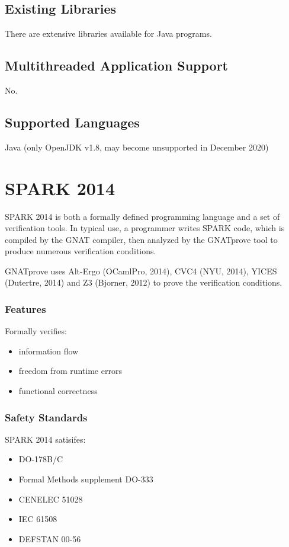 \documentclass[12pt,openany,a4paper]{book}
\begin{document}
	\subsection{Existing Libraries} 
		There are extensive libraries available for Java programs.
	\subsection{Multithreaded Application Support}
	No.
	\subsection{Supported Languages}
	Java (only OpenJDK v1.8, may become unsupported in December 2020)










\section{SPARK 2014}
	SPARK 2014 is both a formally defined programming language and a set of verification tools. In typical use, a programmer writes SPARK code, which is compiled by the GNAT compiler, then analyzed by the GNATprove tool to produce numerous verification conditions.
	
	GNATprove uses Alt-Ergo (OCamlPro, 2014), CVC4 (NYU, 2014), YICES (Dutertre, 2014) and Z3 (Bjorner, 2012) 		to prove the verification conditions.

	\subsubsection{Features}
	Formally verifies:
	\begin{itemize}
		\item information flow
		\item freedom from runtime errors	
		\item functional correctness
	\end{itemize}

	\subsubsection{Safety Standards}
		SPARK 2014 satisifes:
	\begin{itemize}
		\item DO-178B/C
		\item Formal Methods supplement DO-333
		\item CENELEC 51028
		\item IEC 61508
		\item DEFSTAN 00-56
	\end{itemize}
\end{document}
